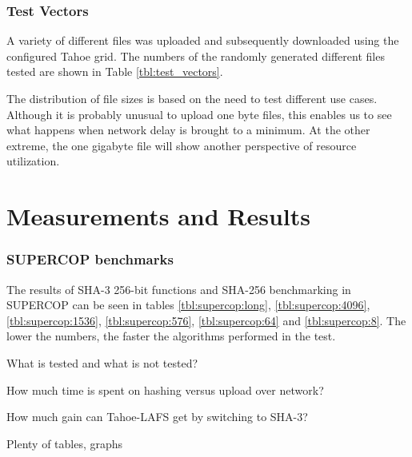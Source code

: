 \documentclass[english,12pt,a4paper]{book}
\begin{document}
\subsection{Test Vectors}

A variety of different files was uploaded and subsequently downloaded using the
configured Tahoe grid. The numbers of the randomly generated different files
tested are shown in Table \ref{tbl:test_vectors}.



The distribution of file sizes is based on the need to test different use cases.
Although it is probably unusual to upload one byte files, this enables us to see
what happens when network delay is brought to a minimum. At the other extreme,
the one gigabyte file will show another perspective of resource utilization.


\chapter{Measurements and Results}



\subsection{\ac{SUPERCOP} benchmarks}
The results of \ac{SHA}-3
256-bit functions and \ac{SHA}-256 benchmarking in \ac{SUPERCOP} can be seen in
tables \ref{tbl:supercop:long}, \ref{tbl:supercop:4096},
\ref{tbl:supercop:1536}, \ref{tbl:supercop:576}, \ref{tbl:supercop:64} and
\ref{tbl:supercop:8}. The lower the numbers, the faster the algorithms
performed in the test.








What is tested and what is not tested?

How much time is spent on hashing versus upload over network?

How much gain can Tahoe-LAFS get by switching to SHA-3?

Plenty of tables, graphs

\end{document}
